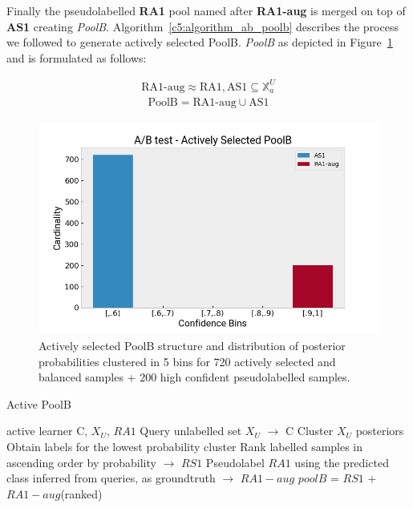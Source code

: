 Finally the pseudolabelled \textbf{RA1} pool named after \textbf{RA1-aug} is merged on top of \textbf{AS1} creating \textit{PoolB}. Algorithm~\ref{c5:algorithm_ab_poolb} describes the process we followed to generate actively selected PoolB.
\textit{PoolB} as depicted in Figure~\ref{c5:figure_ab_pool_b} and is formulated as follows: 

\begin{ceqn}
\begin{align}
      \text{RA1-aug} \approx \text{RA1}, \text{AS1} \subseteq \mathbb{X}^U_a
\end{align} 
\begin{align}
       \text{PoolB} = \text{RA1-aug} \cup \text{AS1}
\end{align} 

\label{c5:active_pool_b}
\end{ceqn}

\begin{figure}[ht!]
    \centering  
    \includegraphics[width=.65\textwidth]{figures/chap5/ab_test/dataset/pred_conf_active}
    \caption{Actively selected PoolB structure and distribution of posterior probabilities clustered in 5 bins for 720 actively selected and balanced samples + 200 high confident pseudolabelled samples.}
    \label{c5:figure_ab_pool_b}
\end{figure} 

\begin{algorithm}
\caption{Active PoolB}
\label{c5:algorithm_ab_poolb}
\begin{algorithmic}[1]
\Require active learner C, $X_{U}$, $RA1$
    \State Query unlabelled set $X_{U}$ $\rightarrow$ C
    \State Cluster $X_{U}$ posteriors
    \State Obtain labels for the lowest probability cluster
    \State Rank labelled samples in ascending order by probability $\rightarrow$ $RS1$
    \State Pseudolabel $RA1$ using the predicted class inferred from queries, as groundtruth  $\rightarrow$ $RA1-aug$
    \State $poolB$ = $RS1$ + $RA1-aug$(ranked)
\EndProcedure
\end{algorithmic}
\end{algorithm}


